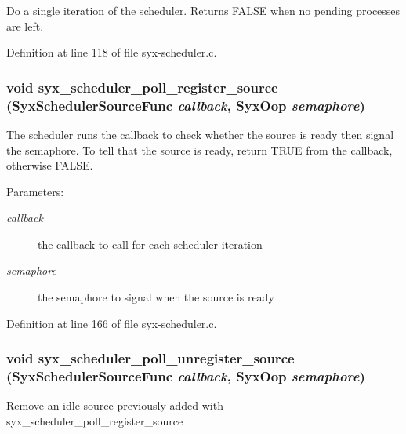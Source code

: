 Do a single iteration of the scheduler. Returns FALSE when no pending processes are left. 

Definition at line 118 of file syx-scheduler.c.\hypertarget{syx-scheduler_8c_55fca0fb039850c253fbb76132099c19}{
\subsubsection{\setlength{\rightskip}{0pt plus 5cm}void syx\_\-scheduler\_\-poll\_\-register\_\-source ({\bf SyxSchedulerSourceFunc} {\em callback}, \/  {\bf SyxOop} {\em semaphore})}}
\label{syx-scheduler_8c_55fca0fb039850c253fbb76132099c19}


The scheduler runs the callback to check whether the source is ready then signal the semaphore. To tell that the source is ready, return TRUE from the callback, otherwise FALSE.

\begin{Desc}
\item[Parameters:]
\begin{description}
\item[{\em callback}]the callback to call for each scheduler iteration \item[{\em semaphore}]the semaphore to signal when the source is ready \end{description}
\end{Desc}


Definition at line 166 of file syx-scheduler.c.\hypertarget{syx-scheduler_8c_3f55059f958063f4332db465abe11958}{
\subsubsection{\setlength{\rightskip}{0pt plus 5cm}void syx\_\-scheduler\_\-poll\_\-unregister\_\-source ({\bf SyxSchedulerSourceFunc} {\em callback}, \/  {\bf SyxOop} {\em semaphore})}}
\label{syx-scheduler_8c_3f55059f958063f4332db465abe11958}


Remove an idle source previously added with syx\_\-scheduler\_\-poll\_\-register\_\-source 

